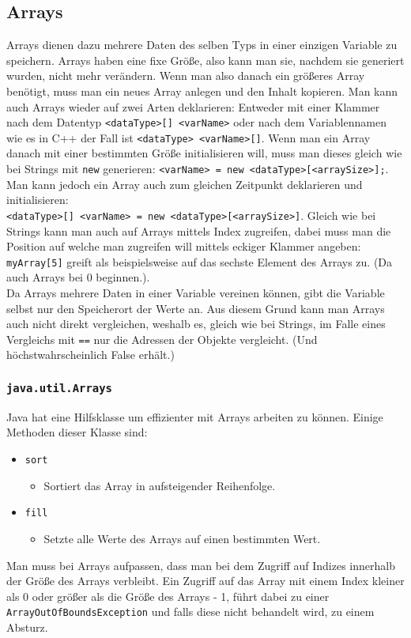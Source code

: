 \documentclass{article}
\begin{document}
	\subsection{Arrays}
	Arrays dienen dazu mehrere Daten des selben Typs in einer einzigen Variable zu speichern. Arrays haben eine fixe Größe, also kann man sie, nachdem sie generiert wurden, nicht mehr verändern. Wenn man also danach ein größeres Array benötigt, muss man ein neues Array anlegen und den Inhalt kopieren. Man kann auch Arrays wieder auf zwei Arten deklarieren: Entweder mit einer Klammer nach dem Datentyp \verb|<dataType>[] <varName>| oder nach dem Variablennamen wie es in C++ der Fall ist \verb|<dataType> <varName>[]|. Wenn man ein Array danach mit einer bestimmten Größe initialisieren will, muss man dieses gleich wie bei Strings mit \verb|new| generieren: \verb|<varName> = new <dataType>[<arraySize>];|.\\
	Man kann jedoch ein Array auch zum gleichen Zeitpunkt deklarieren und initialisieren: \\ \verb|<dataType>[] <varName> = new <dataType>[<arraySize>]|.
	Gleich wie bei Strings kann man auch auf Arrays mittels Index zugreifen, dabei muss man die Position auf welche man zugreifen will mittels eckiger Klammer angeben: \verb|myArray[5]| greift als beispielsweise auf das sechste Element des Arrays zu. (Da auch Arrays bei 0 beginnen.). \\
	Da Arrays mehrere Daten in einer Variable vereinen können, gibt die Variable selbst nur den Speicherort der Werte an. Aus diesem Grund kann man Arrays auch nicht direkt vergleichen, weshalb es, gleich wie bei Strings, im Falle eines Vergleichs mit \verb|==| nur die Adressen der Objekte vergleicht. (Und höchstwahrscheinlich False erhält.) \\
	\cprotect\subsubsection{\texorpdfstring{\verb|java.util.Arrays|}{}}
	Java hat eine Hilfsklasse um effizienter mit Arrays arbeiten zu können. Einige Methoden dieser Klasse sind:
	\begin{itemize}
		\item{\verb|sort|}
		\begin{itemize}
			\item{Sortiert das Array in aufsteigender Reihenfolge.}
		\end{itemize}
		\item{\verb|fill|}
		\begin{itemize}
			\item{Setzte alle Werte des Arrays auf einen bestimmten Wert.}
		\end{itemize}
	\end{itemize}    
	Man muss bei Arrays aufpassen, dass man bei dem Zugriff auf Indizes innerhalb der Größe des Arrays verbleibt. Ein Zugriff auf das Array mit einem Index kleiner als 0 oder größer als die Größe des Arrays - 1, führt dabei zu einer \verb|ArrayOutOfBoundsException| und falls diese nicht behandelt wird, zu einem Absturz.
\end{document}
